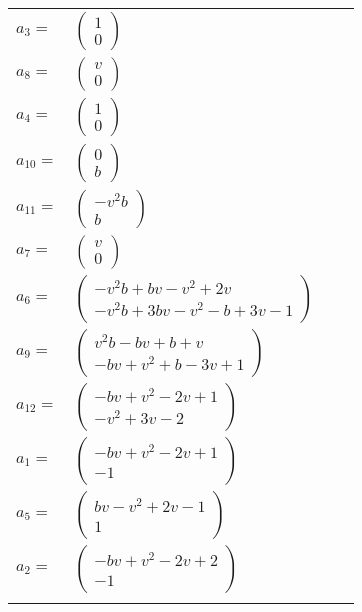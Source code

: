 \documentclass[1p]{elsarticle_modified}
\theoremstyle{definition}
\begin{document}
\begin{tabular}{m{7pt} m{180pt} m{7pt} m{180pt} }
\flushright $a_{3}=$&$\begin{pmatrix}1\\0\end{pmatrix}$ \\
\flushright $a_{8}=$&$\begin{pmatrix}v\\0\end{pmatrix}$ \\
\flushright $a_{4}=$&$\begin{pmatrix}1\\0\end{pmatrix}$ \\
\flushright $a_{10}=$&$\begin{pmatrix}0\\b\end{pmatrix}$ \\
\flushright $a_{11}=$&$\begin{pmatrix}- v^2 b\\b\end{pmatrix}$ \\
\flushright $a_{7}=$&$\begin{pmatrix}v\\0\end{pmatrix}$ \\
\flushright $a_{6}=$&$\begin{pmatrix}- v^2 b+b v- v^2+2 v\\- v^2 b+3 b v- v^2- b+3 v-1\end{pmatrix}$ \\
\flushright $a_{9}=$&$\begin{pmatrix}v^2 b- b v+b+v\\- b v+v^2+b-3 v+1\end{pmatrix}$ \\
\flushright $a_{12}=$&$\begin{pmatrix}- b v+v^2-2 v+1\\- v^2+3 v-2\end{pmatrix}$ \\
\flushright $a_{1}=$&$\begin{pmatrix}- b v+v^2-2 v+1\\-1\end{pmatrix}$ \\
\flushright $a_{5}=$&$\begin{pmatrix}b v- v^2+2 v-1\\1\end{pmatrix}$ \\
\flushright $a_{2}=$&$\begin{pmatrix}- b v+v^2-2 v+2\\-1\end{pmatrix}$\\&\end{tabular}
\end{document}

